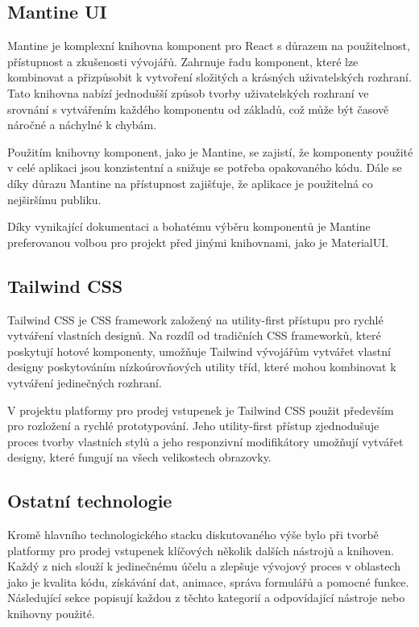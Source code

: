 \subsection{Mantine UI}
\label{subsec:implementace-techologie-mantine}
Mantine je komplexní knihovna komponent pro React s důrazem na použitelnost, přístupnost a zkušenosti vývojářů.
Zahrnuje řadu komponent, které lze kombinovat a přizpůsobit k vytvoření složitých a krásných uživatelských rozhraní.
Tato knihovna nabízí jednodušší způsob tvorby uživatelských rozhraní ve srovnání s vytvářením každého komponentu od základů, což může být časově náročné a náchylné k chybám.

Použitím knihovny komponent, jako je Mantine, se zajistí, že komponenty použité v celé aplikaci jsou konzistentní a snižuje se potřeba opakovaného kódu.
Dále se díky důrazu Mantine na přístupnost zajišťuje, že aplikace je použitelná co nejširšímu publiku.

Díky vynikající dokumentaci a bohatému výběru komponentů je Mantine preferovanou volbou pro projekt před jinými knihovnami, jako je MaterialUI\@.

\subsection{Tailwind CSS}
\label{subsec:implementace-techologie-tailwind}
Tailwind CSS je CSS framework založený na utility-first přístupu pro rychlé vytváření vlastních designů.
Na rozdíl od tradičních CSS frameworků, které poskytují hotové komponenty, umožňuje Tailwind vývojářům vytvářet vlastní designy poskytováním nízkoúrovňových utility tříd, které mohou kombinovat k vytváření jedinečných rozhraní.

V projektu platformy pro prodej vstupenek je Tailwind CSS použit především pro rozložení a rychlé prototypování.
Jeho utility-first přístup zjednodušuje proces tvorby vlastních stylů a jeho responzivní modifikátory umožňují vytvářet designy, které fungují na všech velikostech obrazovky.

\subsection{Ostatní technologie}
\label{subsec:implementace-techologie-ostatni}
Kromě hlavního technologického stacku diskutovaného výše bylo při tvorbě platformy pro prodej vstupenek klíčových několik dalších nástrojů a knihoven.
Každý z nich slouží k jedinečnému účelu a zlepšuje vývojový proces v oblastech jako je kvalita kódu, získávání dat, animace, správa formulářů a pomocné funkce.
Následující sekce popisují každou z těchto kategorií a odpovídající nástroje nebo knihovny použité.

